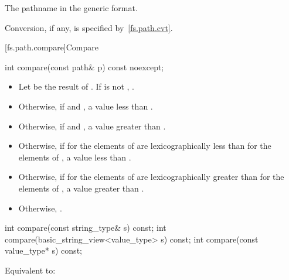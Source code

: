 \begin{itemdescr}
\pnum
\returns
The pathname in the generic format.

\pnum
\remarks
Conversion, if any, is specified by~\ref{fs.path.cvt}.
\end{itemdescr}

[fs.path.compare]{Compare}

%
\begin{itemdecl}
int compare(const path& p) const noexcept;
\end{itemdecl}

\begin{itemdescr}
\pnum
\returns
\begin{itemize}
\item
  Let  be the result of
  .
  If  is not ,
  .
\item
  Otherwise, if
   and ,
  a value less than .
\item
  Otherwise, if
   and ,
  a value greater than .
\item
  Otherwise, if
   for the elements of 
  are lexicographically less than
   for the elements of ,
  a value less than .
\item
  Otherwise, if
   for the elements of 
  are lexicographically greater than
   for the elements of ,
  a value greater than .
\item
  Otherwise, .
\end{itemize}
\end{itemdescr}

%
\begin{itemdecl}
int compare(const string_type& s) const;
int compare(basic_string_view<value_type> s) const;
int compare(const value_type* s) const;
\end{itemdecl}

\begin{itemdescr}
\pnum
\effects
Equivalent to: 
\end{itemdescr}

